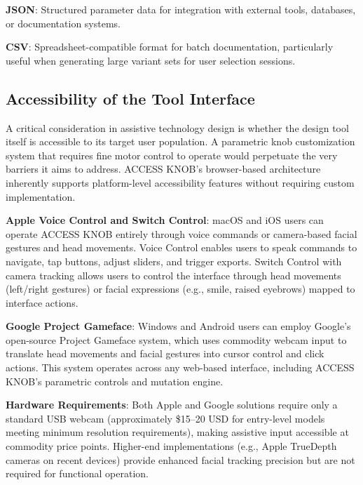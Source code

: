 \documentclass[sigconf]{nimeart}
\begin{document}
\textbf{JSON}: Structured parameter data for integration with external tools, databases, or documentation systems.

\textbf{CSV}: Spreadsheet-compatible format for batch documentation, particularly useful when generating large variant sets for user selection sessions.


\subsection{Accessibility of the Tool Interface}

A critical consideration in assistive technology design is whether the design tool itself is accessible to its target user population. A parametric knob customization system that requires fine motor control to operate would perpetuate the very barriers it aims to address. ACCESS KNOB's browser-based architecture inherently supports platform-level accessibility features without requiring custom implementation.

\textbf{Apple Voice Control and Switch Control}: macOS and iOS users can operate ACCESS KNOB entirely through voice commands\cite{apple2024voicecontrol} or camera-based facial gestures and head movements\cite{apple2024switchcontrol}. Voice Control enables users to speak commands to navigate, tap buttons, adjust sliders, and trigger exports. Switch Control with camera tracking allows users to control the interface through head movements (left/right gestures) or facial expressions (e.g., smile, raised eyebrows) mapped to interface actions. %

\textbf{Google Project Gameface}: Windows and Android users can employ Google's open-source Project Gameface system\cite{google2024gameface,googleblog2023gameface}, which uses commodity webcam input to translate head movements and facial gestures into cursor control and click actions. This system operates across any web-based interface, including ACCESS KNOB's parametric controls and mutation engine.

\textbf{Hardware Requirements}: Both Apple and Google solutions require only a standard USB webcam (approximately \$15--20 USD for entry-level models meeting minimum resolution requirements), making assistive input accessible at commodity price points. Higher-end implementations (e.g., Apple TrueDepth cameras on recent devices) provide enhanced facial tracking precision but are not required for functional operation.
\end{document}

